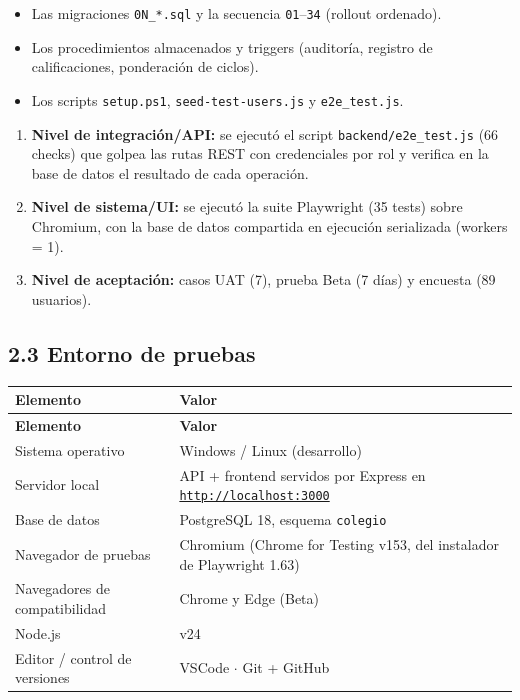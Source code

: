 \documentclass[11pt,a4paper]{article}
\begin{document}
\begin{itemize}[leftmargin=*]
\item Las migraciones \texttt{0N\_*.sql} y la secuencia \texttt{01}--\texttt{34} (rollout ordenado).
\item Los procedimientos almacenados y triggers (auditoría, registro de calificaciones, ponderación de ciclos).
\item Los scripts \texttt{setup.ps1}, \texttt{seed-test-users.js} y \texttt{e2e\_test.js}.
\end{itemize}


\begin{enumerate}[leftmargin=*]
\item \textbf{Nivel de integración/API:} se ejecutó el script \texttt{backend/e2e\_test.js} (66 checks) que golpea las rutas REST con credenciales por rol y verifica en la base de datos el resultado de cada operación.
\item \textbf{Nivel de sistema/UI:} se ejecutó la suite Playwright (35 tests) sobre Chromium, con la base de datos compartida en ejecución serializada (workers = 1).
\item \textbf{Nivel de aceptación:} casos UAT (7), prueba Beta (7 días) y encuesta (89 usuarios).
\end{enumerate}


\subsection*{2.3 Entorno de pruebas}


{\small
\begin{longtable}{|p{}|p{}|}
\rowcolor{UTECblue}\color{white}\bfseries Elemento & \color{white}\bfseries Valor \\ \hline
\endfirsthead
\rowcolor{UTECblue}\color{white}\bfseries Elemento & \color{white}\bfseries Valor \\ \hline
\endhead
Sistema operativo & Windows / Linux (desarrollo) \\ \hline
Servidor local & API + frontend servidos por Express en \texttt{\url{http://localhost:3000}} \\ \hline
Base de datos & PostgreSQL 18, esquema \texttt{colegio} \\ \hline
Navegador de pruebas & Chromium (Chrome for Testing v153, del instalador de Playwright 1.63) \\ \hline
Navegadores de compatibilidad & Chrome y Edge (Beta) \\ \hline
Node.js & v24 \\ \hline
Editor / control de versiones & VSCode {$\cdot$} Git + GitHub \\ \hline
\end{longtable}}
\end{document}

